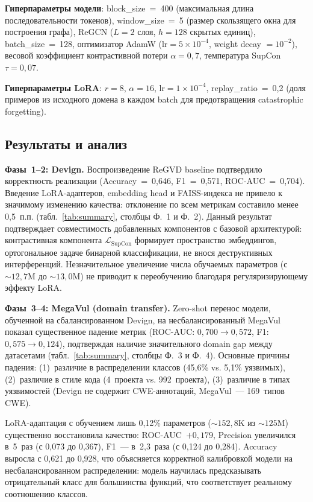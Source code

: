 \documentclass[runningheads]{llncs}
\begin{document}
\textbf{Гиперпараметры модели}: block\_size~=~400 (максимальная длина последовательности токенов), window\_size~=~5 (размер скользящего окна для построения графа), ReGCN ($L{=}2$ слоя, $h{=}128$ скрытых единиц), batch\_size~=~128, оптимизатор AdamW ($\text{lr} = 5 \times 10^{-4}$, weight decay $= 10^{-2}$), весовой коэффициент контрастивной потери $\alpha = 0{,}7$, температура SupCon $\tau = 0{,}07$.

\textbf{Гиперпараметры LoRA}: $r = 8$, $\alpha = 16$, $\text{lr} = 1 \times 10^{-4}$, replay\_ratio~=~0,2 (доля примеров из исходного домена в каждом batch для предотвращения catastrophic forgetting).


\subsection{Результаты и анализ}

\textbf{Фазы~1--2: Devign.}
Воспроизведение ReGVD baseline подтвердило корректность реализации (Accuracy~=~0,646, F1~=~0,571, ROC-AUC~=~0,704). Введение LoRA-адаптеров, embedding head и FAISS-индекса не привело к значимому изменению качества: отклонение по всем метрикам составило менее 0,5~п.п. (табл.~\ref{tab:summary}, столбцы Ф.~1 и Ф.~2). Данный результат подтверждает совместимость добавленных компонентов с базовой архитектурой: контрастивная компонента $\mathcal{L}_{\text{SupCon}}$ формирует пространство эмбеддингов, ортогональное задаче бинарной классификации, не внося деструктивных интерференций. Незначительное увеличение числа обучаемых параметров (с ${\sim}12{,}7$M до ${\sim}13{,}0$M) не приводит к переобучению благодаря регуляризирующему эффекту LoRA.

\textbf{Фазы~3--4: MegaVul (domain transfer).}
Zero-shot перенос модели, обученной на сбалансированном Devign, на несбалансированный MegaVul показал существенное падение метрик (ROC-AUC: $0{,}700 \to 0{,}572$, F1: $0{,}575 \to 0{,}124$), подтверждая наличие значительного domain gap между датасетами (табл.~\ref{tab:summary}, столбцы Ф.~3 и Ф.~4). Основные причины падения: (1)~различие в распределении классов (45,6\% vs. 5,1\% уязвимых), (2)~различие в стиле кода (4~проекта vs. 992~проекта), (3)~различие в типах уязвимостей (Devign не содержит CWE-аннотаций, MegaVul~--- 169~типов CWE).

LoRA-адаптация с обучением лишь 0,12\% параметров (${\sim}152{,}8$K из ${\sim}125$M) существенно восстановила качество: ROC-AUC~$+0{,}179$, Precision увеличился в~5~раз (с 0,073 до 0,367), F1~--- в~2,3~раза (с 0,124 до 0,284). Accuracy выросла с 0,621 до 0,928, что объясняется корректной калибровкой модели на несбалансированном распределении: модель научилась предсказывать отрицательный класс для большинства функций, что соответствует реальному соотношению классов.
\end{document}
